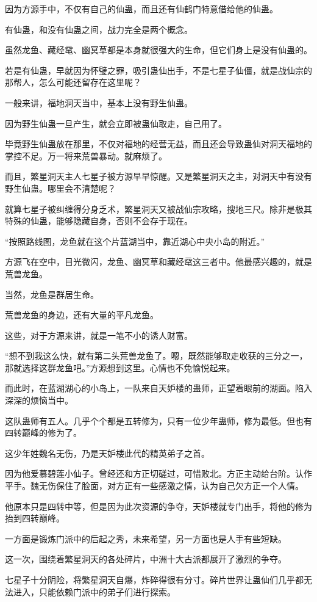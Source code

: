 \begin{this_body}
因为方源手中，不仅有自己的仙蛊，而且还有仙鹤门特意借给他的仙蛊。

有仙蛊，和没有仙蛊之间，战力完全是两个概念。

虽然龙鱼、藏经鼋、幽冥草都是本身就很强大的生命，但它们身上是没有仙蛊的。

若是有仙蛊，早就因为怀璧之罪，吸引蛊仙出手，不是七星子仙僵，就是战仙宗的那帮人，怎么可能还留存在这里呢？

一般来讲，福地洞天当中，基本上没有野生仙蛊。

因为野生仙蛊一旦产生，就会立即被蛊仙取走，自己用了。

毕竟野生仙蛊放在那里，不仅对福地的经营无益，而且还会导致蛊仙对洞天福地的掌控不足。万一将来荒兽暴动。就麻烦了。

而且，繁星洞天主人七星子被方源早早惊醒。又是繁星洞天之主，对洞天中有没有野生仙蛊。哪里会不清楚呢？

就算七星子被纠缠得分身乏术，繁星洞天又被战仙宗攻略，搜地三尺。除非是极其特殊的仙蛊，能够隐藏自身，否则不会存于现在。

“按照路线图，龙鱼就在这个片蓝湖当中，靠近湖心中央小岛的附近。”

方源飞在空中，目光微闪，龙鱼、幽冥草和藏经鼋这三者中。他最感兴趣的，就是荒兽龙鱼。

当然，龙鱼是群居生命。

荒兽龙鱼的身边，还有大量的平凡龙鱼。

这些，对于方源来讲，就是一笔不小的诱人财富。

“想不到我这么快，就有第二头荒兽龙鱼了。嗯，既然能够取走收获的三分之一，那就选择这群龙鱼吧。”方源想到这里。心情也不免愉悦起来。

而此时，在蓝湖湖心的小岛上，一队来自天妒楼的蛊师，正望着眼前的湖面。陷入深深的烦恼当中。

这队蛊师有五人。几乎个个都是五转修为，只有一位少年蛊师，修为最低。但也有四转巅峰的修为了。

这少年姓魏名无伤，乃是天妒楼此代的精英弟子之首。

因为他爱慕碧莲小仙子。曾经还和方正切磋过，可惜败北。方正主动给台阶。认作平手。魏无伤保住了脸面，对方正有一些感激之情，认为自己欠方正一个人情。

他原本只是四转中等，但是因为此次资源的争夺，天妒楼就专门出手，将他的修为抬到四转巅峰。

一方面是锻炼门派中的后起之秀，未来希望，另一方面也是人手有些短缺。

这一次，围绕着繁星洞天的各处碎片，中洲十大古派都展开了激烈的争夺。

七星子十分阴险，将繁星洞天自爆，炸碎得很有分寸。碎片世界让蛊仙们几乎都无法进入，只能依赖门派中的弟子们进行探索。


\end{this_body}
